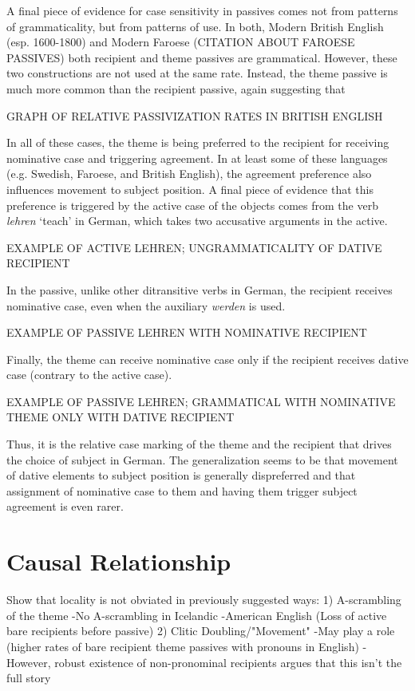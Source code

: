 A final piece of evidence for case sensitivity in passives comes not from patterns of grammaticality, but from patterns of use. In both, Modern British English (esp. 1600-1800) and Modern Faroese (CITATION ABOUT FAROESE PASSIVES) both recipient and theme passives are grammatical. However, these two constructions are not used at the same rate. Instead, the theme passive is much more common than the recipient passive, again suggesting that 
\bigskip

GRAPH OF RELATIVE PASSIVIZATION RATES IN BRITISH ENGLISH
\bigskip

In all of these cases, the theme is being preferred to the recipient for receiving nominative case and triggering agreement. In at least some of these languages (e.g. Swedish, Faroese, and British English), the agreement preference also influences movement to subject position. A final piece of evidence that this preference is triggered by the active case of the objects comes from the verb \textit{lehren} `teach' in German, which takes two accusative arguments in the active.
\bigskip

EXAMPLE OF ACTIVE LEHREN; UNGRAMMATICALITY OF DATIVE RECIPIENT
\bigskip

In the passive, unlike other ditransitive verbs in German, the recipient receives nominative case, even when the auxiliary \textit{werden} is used. 
\bigskip

EXAMPLE OF PASSIVE LEHREN WITH NOMINATIVE RECIPIENT
\bigskip

Finally, the theme can receive nominative case only if the recipient receives dative case (contrary to the active case).
\bigskip

EXAMPLE OF PASSIVE LEHREN; GRAMMATICAL WITH NOMINATIVE THEME ONLY WITH DATIVE RECIPIENT
\bigskip

Thus, it is the relative case marking of the theme and the recipient that drives the choice of subject in German. The generalization seems to be that movement of dative elements to subject position is generally dispreferred and that assignment of nominative case to them and having them trigger subject agreement is even rarer.

\section{Causal Relationship}


Show that locality is not obviated in previously suggested ways:
1) A-scrambling of the theme
	-No A-scrambling in Icelandic
	-American English (Loss of active bare recipients before passive)
2) Clitic Doubling/"Movement"
	-May play a role (higher rates of bare recipient theme passives with pronouns in English)
	-However, robust existence of non-pronominal recipients argues that this isn't the full story

